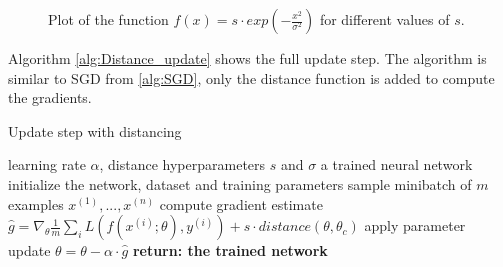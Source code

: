 \begin{figure}[h]\label{fig:Gaussian_strength}
    \centering
    \begin{center}
         \caption{Plot of the function $f(x)=s\cdot exp(-\frac{x^2}{\sigma^2})$ for different values of $s$.}
    \end{center}
\end{figure}

Algorithm \ref{alg:Distance_update} shows the full update step. The algorithm is
similar to SGD from \ref{alg:SGD}, only the distance function is added to
compute the gradients.

\begin{algorithm}\label{alg:Distance_update}
    \begin{algorithmic}[1]
        \caption{Update step with distancing}
        \REQUIRE learning rate $\alpha$, distance hyperparameters $s$ and $\sigma$
        \ENSURE a trained neural network
        \STATE initialize the network, dataset and training parameters
            \STATE sample minibatch of $m$ examples ${x^{(1)}, ... ,x^{(n)}}$
            \STATE compute gradient estimate $\hat{g}=\nabla_\theta \frac{1}{m} \sum_i L(f(x^{(i)};\theta),y^{(i)})+s\cdot distance(\theta , \theta_c)$
            \STATE apply parameter update $\theta=\theta-\alpha\cdot\hat{g}$
        \ENDWHILE
        \STATE \textbf{return: the trained network}
    \end{algorithmic}
\end{algorithm}

